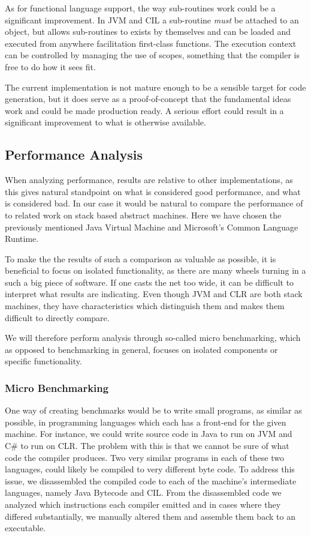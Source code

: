As for functional language support, the way sub-routines work could be a
significant improvement. In JVM and CIL a sub-routine \emph{must} be attached to
an object, but \thename{} allows sub-routines to exists by themselves and can be
loaded and executed from anywhere facilitation first-class functions. The
execution context can be controlled by managing the use of scopes, something
that the compiler is free to do how it sees fit.

The current implementation is not mature enough to be a sensible target for code
generation, but it does serve as a proof-of-concept that the fundamental ideas
work and could be made production ready. A serious effort could result in a
significant improvement to what is otherwise available.

\subsection{Performance Analysis}
\label{sec:eval:performance}

When analyzing performance, results are relative to other implementations, as
this gives natural standpoint on what is considered good performance, and what
is considered bad. In our case it would be natural to compare the performance of
\thename{} to related work on stack based abstract machines. Here we have chosen
the previously mentioned Java Virtual Machine and Microsoft's Common Language
Runtime.

To make the the results of such a comparison as valuable as possible, it is
beneficial to focus on isolated functionality, as there are many wheels turning
in a such a big piece of software. If one casts the net too wide, it can be
difficult to interpret what results are indicating. Even though JVM and CLR are
both stack machines, they have characteristics which distinguish them and makes
them difficult to directly compare. %

We will therefore perform analysis through so-called micro benchmarking, which
as opposed to benchmarking in general, focuses on isolated components or
specific functionality.

\subsubsection{Micro Benchmarking}

One way of creating benchmarks would be to write small programs, as similar as
possible, in programming languages which each has a front-end for the given
machine. For instance, we could write source code in Java to run on JVM and C\#
to run on CLR. The problem with this is that we cannot be sure of what code the
compiler produces. Two very similar programs in each of these two languages,
could likely be compiled to very different byte code. To address this issue, we
disassembled the compiled code to each of the machine's intermediate languages,
namely Java Bytecode and CIL. From the disassembled code we analyzed which
instructions each compiler emitted and in cases where they differed
substantially, we manually altered them and assemble them back to an executable.

